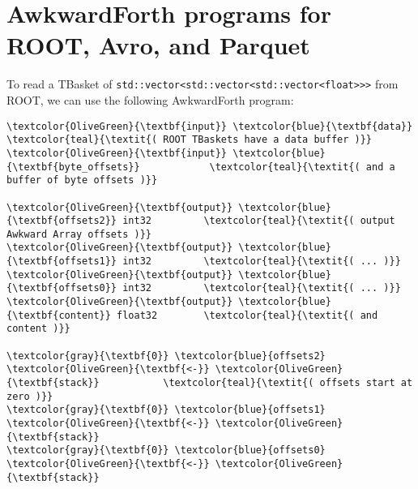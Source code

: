 \documentclass{webofc}
\begin{document}
\section{AwkwardForth programs for ROOT, Avro, and Parquet}

To read a TBasket of \texttt{std::vector<std::vector<std::vector<float>>>} from ROOT, we can use the following AwkwardForth program:

\begin{Verbatim}[commandchars=\\\{\}]
\textcolor{OliveGreen}{\textbf{input}} \textcolor{blue}{\textbf{data}}                    \textcolor{teal}{\textit{( ROOT TBaskets have a data buffer )}}
\textcolor{OliveGreen}{\textbf{input}} \textcolor{blue}{\textbf{byte_offsets}}            \textcolor{teal}{\textit{( and a buffer of byte offsets )}}

\textcolor{OliveGreen}{\textbf{output}} \textcolor{blue}{\textbf{offsets2}} int32         \textcolor{teal}{\textit{( output Awkward Array offsets )}}
\textcolor{OliveGreen}{\textbf{output}} \textcolor{blue}{\textbf{offsets1}} int32         \textcolor{teal}{\textit{( ... )}}
\textcolor{OliveGreen}{\textbf{output}} \textcolor{blue}{\textbf{offsets0}} int32         \textcolor{teal}{\textit{( ... )}}
\textcolor{OliveGreen}{\textbf{output}} \textcolor{blue}{\textbf{content}} float32        \textcolor{teal}{\textit{( and content )}}

\textcolor{gray}{\textbf{0}} \textcolor{blue}{offsets2} \textcolor{OliveGreen}{\textbf{<-}} \textcolor{OliveGreen}{\textbf{stack}}           \textcolor{teal}{\textit{( offsets start at zero )}}
\textcolor{gray}{\textbf{0}} \textcolor{blue}{offsets1} \textcolor{OliveGreen}{\textbf{<-}} \textcolor{OliveGreen}{\textbf{stack}}
\textcolor{gray}{\textbf{0}} \textcolor{blue}{offsets0} \textcolor{OliveGreen}{\textbf{<-}} \textcolor{OliveGreen}{\textbf{stack}}


\end{Verbatim}
\end{document}
